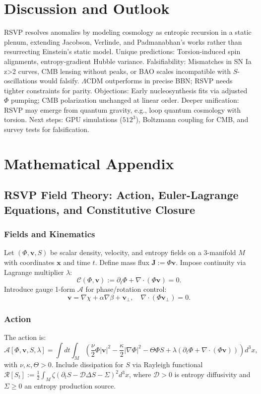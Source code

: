 \documentclass[11pt]{article}
\theoremstyle{plain}
\theoremstyle{definition}
\begin{document}
\section{Discussion and Outlook}
RSVP resolves anomalies by modeling cosmology as entropic recursion in a static plenum, extending Jacobson, Verlinde, and Padmanabhan's works rather than resurrecting Einstein's static model.
Unique predictions: Torsion-induced spin alignments, entropy-gradient Hubble variance.
Falsifiability: Mismatches in SN Ia z>2 curves, CMB lensing without peaks, or BAO scales incompatible with $S$-oscillations would falsify. $\Lambda$CDM outperforms in precise BBN; RSVP needs tighter constraints for parity.
Objections: Early nucleosynthesis fits via adjusted $\Phi$ pumping; CMB polarization unchanged at linear order.
Deeper unification: RSVP may emerge from quantum gravity, e.g., loop quantum cosmology with torsion. Next steps: GPU simulations ($512^3$), Boltzmann coupling for CMB, and survey tests for falsification.
\appendix
\section{Mathematical Appendix}
\subsection{RSVP Field Theory: Action, Euler-Lagrange Equations, and Constitutive Closure}
\subsubsection{Fields and Kinematics}
Let $(\Phi, \bm{v}, S)$ be scalar density, velocity, and entropy fields on a 3-manifold $M$ with coordinates $\bm{x}$ and time $t$. Define mass flux $\bm{J} := \Phi \bm{v}$. Impose continuity via Lagrange multiplier $\lambda$:
\[
\mathcal{C}(\Phi, \bm{v}) := \partial_t \Phi + \nabla \cdot (\Phi \bm{v}) = 0.
\]
Introduce gauge 1-form $\mathcal{A}$ for phase/rotation control:
\[
\bm{v} = \nabla \chi + \alpha \nabla \beta + \bm{v}_\perp, \quad \nabla \cdot (\Phi \bm{v}_\perp) = 0.
\]
\subsubsection{Action}
The action is:
\[
\mathcal{A}[\Phi, \bm{v}, S, \lambda] = \int dt \int_M \left( \frac{\nu}{2} \Phi |\bm{v}|^2 - \frac{\kappa}{2} |\nabla \Phi|^2 - \Theta \Phi S + \lambda (\partial_t \Phi + \nabla \cdot (\Phi \bm{v})) \right) d^3x,
\]
with $\nu, \kappa, \Theta > 0$. Include dissipation for $S$ via Rayleigh functional $\mathcal{R}[S_t] := \frac{1}{2} \int_M \zeta (\partial_t S - \mathcal{D} \Delta S - \Sigma)^2 d^3x$, where $\mathcal{D} > 0$ is entropy diffusivity and $\Sigma \geq 0$ an entropy production source.
\end{document}
